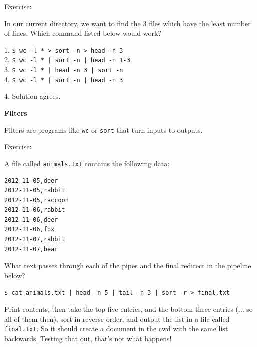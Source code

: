\documentclass[12pt]{article}
\begin{document}
\begin{addmargin}[1cm]{0cm}
\color{gray}
\vspace{1em}\underline{Exercise:}

In our current directory, we want to find the 3 files which have the least number of lines. Which command listed below would work?

1. \texttt{\$ wc -l * > sort -n > head -n 3}
\\2. \texttt{\$ wc -l * | sort -n | head -n 1-3}
\\3. \texttt{\$ wc -l * | head -n 3 | sort -n}
\\4. \texttt{\$ wc -l * | sort -n | head -n 3}

\vspace{1em}
\color{black}

4. Solution agrees.
\end{addmargin}

\textbf{Filters}

Filters are programs like \texttt{wc} or \texttt{sort} that turn inputs to outputs.

\begin{addmargin}[1cm]{0cm}
\color{gray}
\vspace{1em}\underline{Exercise:}

A file called \texttt{animals.txt} contains the following data:

\begin{verbatim}
2012-11-05,deer
2012-11-05,rabbit
2012-11-05,raccoon
2012-11-06,rabbit
2012-11-06,deer
2012-11-06,fox
2012-11-07,rabbit
2012-11-07,bear
\end{verbatim}
What text passes through each of the pipes and the final redirect in the pipeline below?

\texttt{\$ cat animals.txt | head -n 5 | tail -n 3 | sort -r > final.txt}

\vspace{1em}
\color{black}

Print contents, then take the top five entries, and the bottom three entries (... so all of them then), sort in reverse order, and output the list in a file called \texttt{final.txt}. So it should create a document in the cwd with the same list backwards. Testing that out, that's not what happens! 
\end{addmargin}
\end{document}
